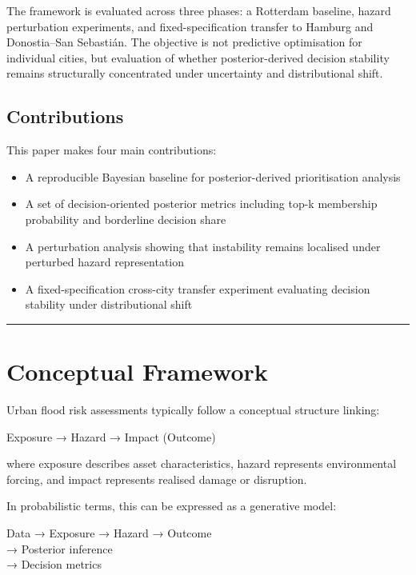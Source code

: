 \documentclass[
]{article}
\providecommand{\tightlist}{%
  \setlength{\itemsep}{0pt}\setlength{\parskip}{0pt}}
\begin{document}
The framework is evaluated across three phases: a Rotterdam baseline,
hazard perturbation experiments, and fixed-specification transfer to
Hamburg and Donostia–San Sebastián. The objective is not predictive
optimisation for individual cities, but evaluation of whether
posterior-derived decision stability remains structurally concentrated
under uncertainty and distributional shift.

\subsection{Contributions}\label{contributions}

This paper makes four main contributions:

\begin{itemize}
\tightlist
\item
  A reproducible Bayesian baseline for posterior-derived prioritisation
  analysis
\item
  A set of decision-oriented posterior metrics including top-k
  membership probability and borderline decision share
\item
  A perturbation analysis showing that instability remains localised
  under perturbed hazard representation
\item
  A fixed-specification cross-city transfer experiment evaluating
  decision stability under distributional shift
\end{itemize}

\begin{center}\rule{0.5\linewidth}{0.5pt}\end{center}

\section{Conceptual Framework}\label{conceptual-framework}

Urban flood risk assessments typically follow a conceptual structure
linking:

Exposure → Hazard → Impact (Outcome)

where exposure describes asset characteristics, hazard represents
environmental forcing, and impact represents realised damage or
disruption.

In probabilistic terms, this can be expressed as a generative model:

Data → Exposure → Hazard → Outcome\\
→ Posterior inference\\
→ Decision metrics
\end{document}
